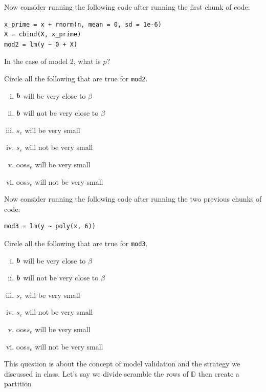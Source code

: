 \documentclass[12pt]{article}
\begin{document}
Now consider running the following code after running the first chunk of code:\\

\begin{lstlisting}
x_prime = x + rnorm(n, mean = 0, sd = 1e-6)
X = cbind(X, x_prime)
mod2 = lm(y ~ 0 + X)
\end{lstlisting}

 In the case of model 2, what is $p$?

 Circle all the following that are true for \texttt{mod2}.

\begin{enumerate}[i)]
\item $\boldsymbol{b}$ will be very close to $\beta$
\item $\boldsymbol{b}$ will not be very close to $\beta$
\item $s_e$ will be very small
\item $s_e$ will not be very small
\item oos$s_e$ will be very small
\item oos$s_e$ will not be very small
\end{enumerate}

Now consider running the following code after running the two previous chunks of code:\\

\begin{lstlisting}
mod3 = lm(y ~ poly(x, 6))
\end{lstlisting}

 Circle all the following that are true for \texttt{mod3}.

\begin{enumerate}[i)]
\item $\boldsymbol{b}$ will be very close to $\beta$
\item $\boldsymbol{b}$ will not be very close to $\beta$
\item $s_e$ will be very small
\item $s_e$ will not be very small
\item oos$s_e$ will be very small
\item oos$s_e$ will not be very small
\end{enumerate}

\eenum

\problem This question is about the concept of model validation and the strategy we discussed in class. Let's say we divide scramble the rows of $\mathbb{D}$ then create a partition 
\end{document}
